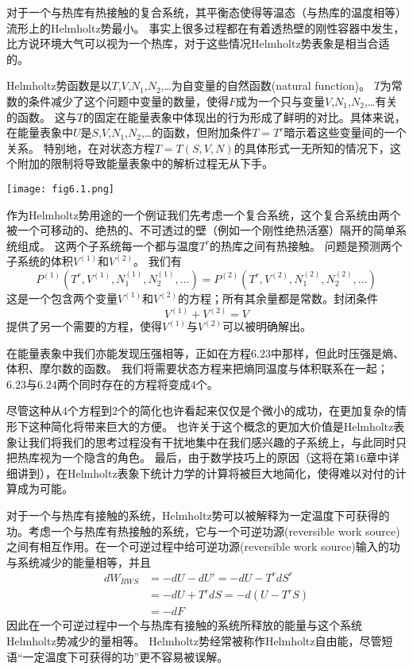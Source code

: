 对于一个与热库有热接触的复合系统，其平衡态使得等温态（与热库的温度相等）流形上的Helmholtz势最小。
事实上很多过程都在有着透热壁的刚性容器中发生，比方说环境大气可以视为一个热库，对于这些情况Helmholtz势表象是相当合适的。

 Helmholtz势函数是以$T$,$V$,$N_1$,$N_2$,…为自变量的自然函数(natural function)。
$T$为常数的条件减少了这个问题中变量的数量，使得$F$成为一个只与变量$V$,$N_1$,$N_2$,…有关的函数。
这与$T$的固定在能量表象中体现出的行为形成了鲜明的对比。具体来说，在能量表象中$U$是$S$,$V$,$N_1$,$N_2$,…的函数，但附加条件$T=T^r$暗示着这些变量间的一个关系。
特别地，在对状态方程$T=T(S, V, N)$的具体形式一无所知的情况下，这个附加的限制将导致能量表象中的解析过程无从下手。

{
    \centering
    \texttt{[image: fig6.1.png]}
}

作为Helmholtz势用途的一个例证我们先考虑一个复合系统，这个复合系统由两个被一个可移动的、绝热的、不可透过的壁（例如一个刚性绝热活塞）隔开的简单系统组成。
这两个子系统每一个都与温度$T^r$的热库之间有热接触。
问题是预测两个子系统的体积$V^{(1)}$和$V^{(2)}$。
我们有
\begin{equation}
\label{equ6.23}
P^{(1)}\left(T^r, V^{(1)}, N_1^{(1)}, N_2^{(1)}, ...\right)=P^{(2)}\left(T^r, V^{(2)}, N_1^{(2)}, N_2^{(2)}, ...\right)
\end{equation}
这是一个包含两个变量$V^{(1)}$和$V^{(2)}$的方程；所有其余量都是常数。封闭条件
\begin{equation}
\label{equ6.24}
V^{(1)}+V^{(2)}=V
\end{equation}
提供了另一个需要的方程，使得$V^{(1)}$与$V^{(2)}$可以被明确解出。

在能量表象中我们亦能发现压强相等，正如在方程$6.23$中那样，但此时压强是熵、体积、摩尔数的函数。
我们将需要状态方程来把熵同温度与体积联系在一起；$6.23$与$6.24$两个同时存在的方程将变成$4$个。

尽管这种从$4$个方程到$2$个的简化也许看起来仅仅是个微小的成功，在更加复杂的情形下这种简化将带来巨大的方便。
也许关于这个概念的更加大价值是Helmholtz表象让我们将我们的思考过程没有干扰地集中在我们感兴趣的子系统上，与此同时只把热库视为一个隐含的角色。
最后，由于数学技巧上的原因（这将在第$16$章中详细讲到），在Helmholtz表象下统计力学的计算将被巨大地简化，使得难以对付的计算成为可能。

对于一个与热库有接触的系统，Helmholtz势可以被解释为一定温度下可获得的功。考虑一个与热库有热接触的系统，它与一个可逆功源(reversible work source)之间有相互作用。在一个可逆过程中给可逆功源(reversible work source)输入的功与系统减少的能量相等，并且
\begin{align}
\label{equ6.25}
dW_{RWS}&=-dU-dU'=-dU-T^rdS^r \\
\label{equ6.26}
                  &=-dU+T^rdS=-d(U-T^rS) \\
\label{equ6.27}
                  &=-dF
\end{align}
因此在一个可逆过程中一个与热库有接触的系统所释放的能量与这个系统Helmholtz势减少的量相等。
Helmholtz势经常被称作Helmholtz自由能，尽管短语“一定温度下可获得的功”更不容易被误解。

